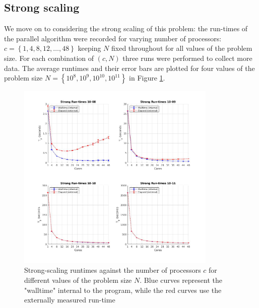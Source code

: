 \documentclass{article}
\begin{document}
\subsection{Strong scaling}

We move on to considering the strong scaling of this problem: the run-times of the parallel algorithm were recorded for varying number of processors: $c=\left\{ 1, 4, 8, 12, \dots , 48 \right\}$ keeping $N$ fixed throughout for all values of the problem size. For each combination of $\left(c,N\right)$ three runs were performed to collect more data. The average runtimes and their error bars are plotted for four values of the problem size $N=\left\{ 10^{8}, 10^{9}, 10^{10}, 10^{11} \right\}$ in Figure \ref{strong_runtimes}.

\begin{figure}[h]
\centering
\includegraphics[width=0.85\textwidth]{strong_runtimes}
\caption{Strong-scaling runtimes against the number of processors $c$ for different values of the problem size $N$. Blue curves represent the "walltime" internal to the program, while the red curves use the externally measured run-time}
\label{strong_runtimes}
\end{figure}
\end{document}
